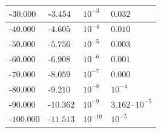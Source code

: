 \begin{center}
{\begin{tabular}{l|l|l|l}
			-$30.000$ & -$3.454$ & $10^{-3}$ & $0.032$ \\ \hline
			-$40.000$ & -$4.605$ & $10^{-4}$ & $0.010$ \\ \hline
			-$50.000$ & -$5.756$ & $10^{-5}$ & $0.003$ \\ \hline
			-$60.000$ & -$6.908$ & $10^{-6}$ & $0.001$ \\ \hline
			-$70.000$ & -$8.059$ & $10^{-7}$ & $0.000$ \\ \hline
			-$80.000$ & -$9.210$ & $10^{-8}$ & $10^{-4}$ \\ \hline
			-$90.000$ & -$10.362$ & $10^{-9}$ & $3.162 \cdot 10^{-5}$ \\ \hline
			-$100.000$ & -$11.513$ & $10^{-10}$ & $10^{-5}$ \\ \hline
		\end{tabular}
	}
\end{center}